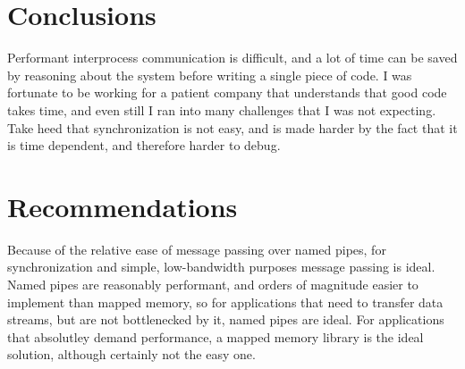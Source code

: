 \documentclass[se]{uw-wkrpt}
\begin{document}
\section{Conclusions}

Performant interprocess communication is difficult, and a lot of time can be saved by reasoning about the system
before writing a single piece of code. I was fortunate to be working for a patient company that understands that
good code takes time, and even still I ran into many challenges that I was not expecting. Take heed that synchronization
is not easy, and is made harder by the fact that it is time dependent, and therefore harder to debug. 

\section{Recommendations}

Because of the relative ease of message passing over named pipes, for synchronization and simple, low-bandwidth purposes
message passing is ideal. Named pipes are reasonably performant, and orders of magnitude easier to implement than
mapped memory, so for applications that need to transfer data streams, but are not bottlenecked by it, named pipes are
ideal. For applications that absolutley demand performance, a mapped memory library is the ideal solution, although certainly
not the easy one.
\end{document}
